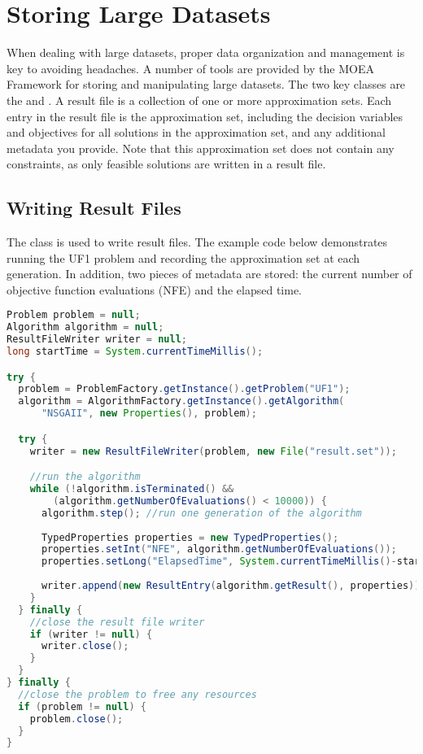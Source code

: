 \section{Storing Large Datasets}
When dealing with large datasets, proper data organization and management is key to avoiding headaches.  A number of tools are provided by the MOEA Framework for storing and manipulating large datasets.  The two key classes are the  and .  A result file is a collection of one or more approximation sets.  Each entry in the result file is the approximation set, including the decision variables and objectives for all solutions in the approximation set, and any additional metadata you provide.  Note that this approximation set does not contain any constraints, as only feasible solutions are written in a result file.

\subsection{Writing Result Files}

The  class is used to write result files.  The example code below demonstrates running the UF1 problem and recording the approximation set at each generation.  In addition, two pieces of metadata are stored: the current number of objective function evaluations (NFE) and the elapsed time.

\begin{lstlisting}[language=Java]
Problem problem = null;
Algorithm algorithm = null;
ResultFileWriter writer = null;
long startTime = System.currentTimeMillis();

try {
  problem = ProblemFactory.getInstance().getProblem("UF1");  
  algorithm = AlgorithmFactory.getInstance().getAlgorithm(
      "NSGAII", new Properties(), problem);

  try {
    writer = new ResultFileWriter(problem, new File("result.set"));

    //run the algorithm
    while (!algorithm.isTerminated() && 
        (algorithm.getNumberOfEvaluations() < 10000)) {
      algorithm.step(); //run one generation of the algorithm
    
      TypedProperties properties = new TypedProperties();
      properties.setInt("NFE", algorithm.getNumberOfEvaluations());
      properties.setLong("ElapsedTime", System.currentTimeMillis()-start);
      
      writer.append(new ResultEntry(algorithm.getResult(), properties));
    }
  } finally {
    //close the result file writer
    if (writer != null) {
      writer.close();
    }
  }
} finally {
  //close the problem to free any resources
  if (problem != null) {
    problem.close(); 
  }
}
\end{lstlisting}

